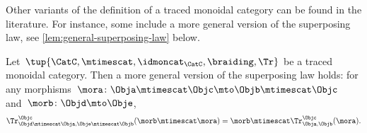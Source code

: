 \begin{remark}
	Other variants of the definition of a traced monoidal category can be found in the literature.
	For instance, some include a more general version of the superposing law, see \cref{lem:general-superposing-law} below.
\end{remark}

\begin{lemma}
	\label{lem:general-superposing-law}
	Let~$\tup{\CatC,\mtimescat,\idmoncat_{\CatC}, \braiding, \Tr}$ be a traced monoidal category.
	Then a more general version of the superposing law holds: for any morphisms~$\mora\colon \Obja\mtimescat \Objc \mto \Objb \mtimescat \Objc$ and~$\morb \colon \Objd \mto \Obje$,
	\begin{equation}
		\label{eq:superposing_2}
		\Tr_{\Objd\mtimescat \Obja,\Obje\mtimescat \Objb}^{\Objc}(\morb \mtimescat \mora)=\morb \mtimescat \Tr_{\Obja,\Objb}^\Objc(\mora).
	\end{equation}
\end{lemma}
\missingproof



